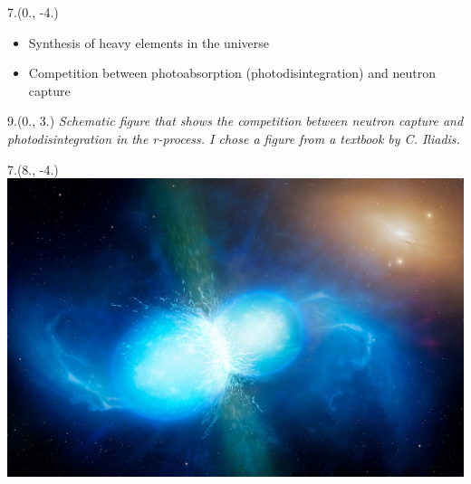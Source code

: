 



\begin{textblock}{7.}(0., -4.)
    \begin{itemize}
        \item Synthesis of heavy elements in the universe
        \item Competition between photoabsorption (photodisintegration) and neutron capture
    \end{itemize}
\end{textblock}

\begin{textblock}{9.}(0., 3.)
    \textit{Schematic figure that shows the competition between neutron capture and photodisintegration in the r-process.
    I chose a figure from a textbook by C. Iliadis.}
\end{textblock}

\begin{textblock}{7.}(8., -4.)
    \includegraphics[width=\textwidth]{figures/neutron_star_merger.jpg}
\end{textblock}